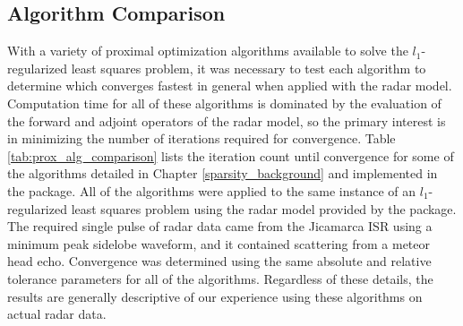 \subsection{Algorithm Comparison}
With a variety of proximal optimization algorithms available to solve the $l_1$-regularized least squares problem, it was necessary to test each algorithm to determine which converges fastest in general when applied with the radar model. Computation time for all of these algorithms is dominated by the evaluation of the forward and adjoint operators of the radar model, so the primary interest is in minimizing the number of iterations required for convergence. Table \ref{tab:prox_alg_comparison} lists the iteration count until convergence for some of the algorithms detailed in Chapter \ref{sparsity_background} and implemented in the  package. All of the algorithms were applied to the same instance of an $l_1$-regularized least squares problem using the radar model provided by the  package. The required single pulse of radar data came from the Jicamarca ISR using a minimum peak sidelobe waveform, and it contained scattering from a meteor head echo. Convergence was determined using the same absolute and relative tolerance parameters for all of the algorithms. Regardless of these details, the results are generally descriptive of our experience using these algorithms on actual radar data.
